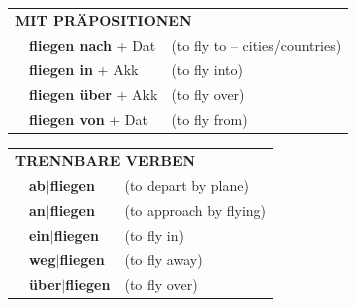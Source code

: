 \documentclass[10pt,a4paper]{revtex4-2}
\begin{document}
\begin{verbbox}
   \vspace{10pt}

   \begin{tabular}{lll}
      \multicolumn{3}{l}{\textbf{MIT PRÄPOSITIONEN}}\\
& \textbf{fliegen nach} + Dat & (to fly to – cities/countries)\\
& \textbf{fliegen in} + Akk & (to fly into)\\
& \textbf{fliegen über} + Akk & (to fly over)\\
& \textbf{fliegen von} + Dat & (to fly from)\\
   \end{tabular}
  \hfill
   \begin{tabular}{lll}
      \multicolumn{3}{l}{\textbf{TRENNBARE VERBEN}}\\
 & \textbf{ab$|$fliegen} & (to depart by plane)\\
 & \textbf{an$|$fliegen} & (to approach by flying)\\
 & \textbf{ein$|$fliegen} & (to fly in)\\
 & \textbf{weg$|$fliegen} & (to fly away)\\
 & \textbf{über$|$fliegen} & (to fly over)\\
  \end{tabular}

\vspace{-5pt}
\end{verbbox}
\end{document}

